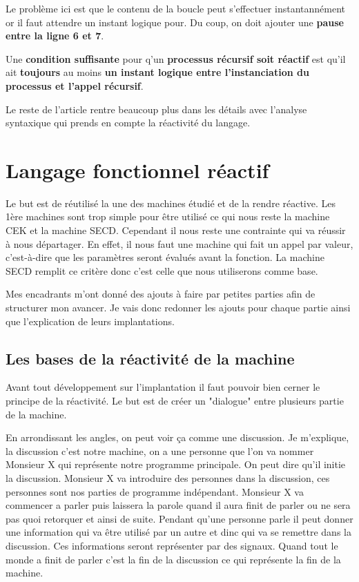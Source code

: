 \documentclass[10pt,a4paper]{article}
\begin{document}
			Le probl\`{e}me ici est que le contenu de la boucle peut s'effectuer instantann\'{e}ment or il faut attendre un instant logique pour. Du coup, on doit ajouter une \textbf{pause entre la ligne 6 et 7}.
			\bigbreak
				
			Une \textbf{condition suffisante} pour q'un \textbf{processus r\'{e}cursif soit r\'{e}actif} est qu'il ait \textbf{toujours} au moins \textbf{un instant logique entre l'instanciation du processus et l'appel r\'{e}cursif}.
			\bigbreak
				
			Le reste de l'article rentre beaucoup plus dans les détails avec l'analyse syntaxique qui prends en compte la réactivité du langage.
		
			\newpage
			
			
			
	\section{Langage fonctionnel réactif}\label{SECDConc4}
			
		Le but est de réutilisé la une des machines étudié et de la rendre réactive. Les 1ère machines sont trop simple pour être utilisé ce qui nous reste la machine CEK et la machine SECD. Cependant il nous reste une contrainte qui va réussir à nous départager. En effet, il nous faut une machine qui fait un appel par valeur, c'est-à-dire que les paramètres seront évalués avant la fonction. La machine SECD remplit ce critère donc c'est celle que nous utiliserons comme base.
		\medbreak
			
		Mes encadrants m'ont donné des ajouts à faire par petites parties afin de structurer mon avancer. Je vais donc redonner les ajouts pour chaque partie ainsi que l'explication de leurs implantations.
		\bigbreak
			
			
		\subsection{Les bases de la réactivité de la machine}
				
			Avant tout développement sur l'implantation il faut pouvoir bien cerner le principe de la réactivité. Le but est de créer un "dialogue" entre plusieurs partie de la machine. 
			\medbreak
				
			En arrondissant les angles, on peut voir ça comme une discussion. Je m'explique, la discussion c'est notre machine, on a une personne que l'on va nommer Monsieur X qui représente notre programme principale. On peut dire qu'il initie la discussion. Monsieur X va introduire des personnes dans la discussion, ces personnes sont nos parties de programme indépendant. Monsieur X va commencer a parler puis laissera la parole quand il aura finit de parler ou ne sera pas quoi retorquer et ainsi de suite. Pendant qu'une personne parle il peut donner une information qui va être utilisé par un autre et dinc qui va se remettre dans la discussion. Ces informations seront représenter par des signaux. Quand tout le monde a finit de parler c'est la fin de la discussion ce qui représente la fin de la machine.
			\medbreak
				
\end{document}
